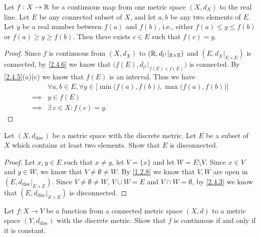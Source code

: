 \begin{cor}\label{2.4.7}
  Let \(f : X \to \mathbb{R}\) be a continuous map from one metric space \((X, d_X)\) to the real line.
  Let \(E\) be any connected subset of \(X\), and let \(a, b\) be any two elements of \(E\).
  Let \(y\) be a real number between \(f(a)\) and \(f(b)\), i.e., either \(f(a) \leq y \leq f(b)\) or \(f(a) \geq y \geq f(b)\).
  Then there exists \(c \in E\) such that \(f(c) = y\).
\end{cor}

\begin{proof}
  Since \(f\) is continuous from \((X, d_X)\) to \((\mathbb{R}, d_{l^1}|_{\mathbb{R} \times \mathbb{R}})\) and \((E, d_X|_{E \times E})\) is connected, by \cref{2.4.6} we know that \(\big(f(E), d_{l^1}|_{f(E) \times f(E)}\big)\) is connected.
  By \cref{2.4.5}(a)(c) we know that \(f(E)\) is an interval.
  Thus we have
  \begin{align*}
             & \forall a, b \in E, \forall y \in \Big[\min\big(f(a), f(b)\big), \max\big(f(a), f(b)\big)\Big] \\
    \implies & y \in f(E)                                                                                     \\
    \implies & \exists\ c \in X : f(c) = y.
  \end{align*}
\end{proof}

\exercisesection

\begin{ex}\label{ex:2.4.1}
  Let \((X, d_{\text{disc}})\) be a metric space with the discrete metric.
  Let \(E\) be a subset of \(X\) which contains at least two elements.
  Show that \(E\) is disconnected.
\end{ex}

\begin{proof}
  Let \(x, y \in E\) such that \(x \neq y\), let \(V = \{x\}\) and let \(W = E \setminus V\).
  Since \(x \in V\) and \(y \in W\), we know that \(V \neq \emptyset \neq W\).
  By \cref{1.2.8} we know that \(V, W\) are open in \((E, d_{\text{disc}}|_{E \times E})\).
  Since \(V \neq \emptyset \neq W\), \(V \cup W = E\) and \(V \cap W = \emptyset\), by \cref{2.4.3} we know that \((E, d_{\text{disc}}|_{E \times E})\) is disconnected.
\end{proof}

\begin{ex}\label{ex:2.4.2}
  Let \(f : X \to Y\) be a function from a connected metric space \((X, d)\) to a metric space \((Y, d_{\text{disc}})\) with the discrete metric.
  Show that \(f\) is continuous if and only if it is constant.
\end{ex}

